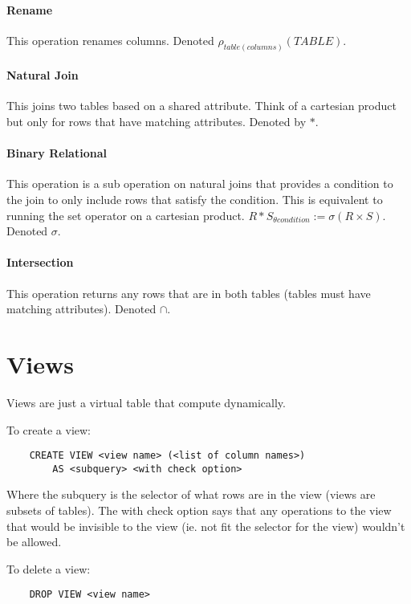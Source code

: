 \documentclass{article}
\begin{document}
\paragraph{Rename} %
\label{par:rename}
This operation renames columns. Denoted $\rho_{table(columns)}(TABLE)$.
\paragraph{Natural Join} %
\label{par:natural_join}
This joins two tables based on a shared attribute. Think of a cartesian product but only for rows that have matching attributes. Denoted by $*$.
\paragraph{Binary Relational} %
\label{par:binary_relational}
This operation is a sub operation on natural joins that provides a condition to the join to only include rows that satisfy the condition. This is equivalent to running the set operator on a cartesian product. $R*S_{\theta condition} := \sigma(R\times S)$. Denoted $\sigma$.
\paragraph{Intersection} %
\label{par:intersection}
This operation returns any rows that are in both tables (tables must have matching attributes). Denoted $\cap$.

\section*{Views} %
\label{sec:views}
Views are just a virtual table that compute dynamically.

To create a view:
\begin{verbatim}
    CREATE VIEW <view name> (<list of column names>)
        AS <subquery> <with check option>
\end{verbatim}
Where the subquery is the selector of what rows are in the view (views are subsets of tables). The with check option says that any operations to the view that would be invisible to the view (ie. not fit the selector for the view) wouldn't be allowed.

To delete a view:
\begin{verbatim}
    DROP VIEW <view name>
\end{verbatim}
\end{document}

